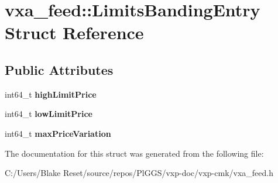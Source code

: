 \hypertarget{structvxa__feed_1_1_limits_banding_entry}{}\section{vxa\+\_\+feed\+::Limits\+Banding\+Entry Struct Reference}
\label{structvxa__feed_1_1_limits_banding_entry}
\subsection*{Public Attributes}
\begin{DoxyCompactItemize}
\item 
\mbox{\label{structvxa__feed_1_1_limits_banding_entry_aa1997b264f6d28b137e0a8b339f0907c}} 
int64\+\_\+t {\bfseries high\+Limit\+Price}
\item 
\mbox{\label{structvxa__feed_1_1_limits_banding_entry_a5179d88cbc8e92344f59c32352fe0ac7}} 
int64\+\_\+t {\bfseries low\+Limit\+Price}
\item 
\mbox{\label{structvxa__feed_1_1_limits_banding_entry_ab0e28bfb9a479b325774f7d90a5c45d5}} 
int64\+\_\+t {\bfseries max\+Price\+Variation}
\end{DoxyCompactItemize}


The documentation for this struct was generated from the following file\+:\begin{DoxyCompactItemize}
\item 
C\+:/\+Users/\+Blake Reset/source/repos/\+Pl\+G\+G\+S/vxp-\/doc/vxp-\/cmk/vxa\+\_\+feed.\+h\end{DoxyCompactItemize}
